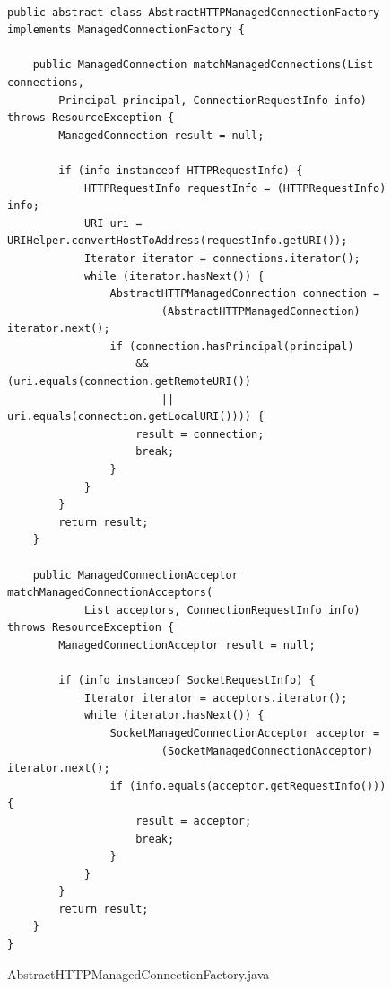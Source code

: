 \begin{figure}[!tbp]
\centering
\lstset{language=Java, stepnumber=1, showspaces=false, showstringspaces=false,breaklines=true}
\begin{lstlisting}

public abstract class AbstractHTTPManagedConnectionFactory implements ManagedConnectionFactory {

    public ManagedConnection matchManagedConnections(List connections,
        Principal principal, ConnectionRequestInfo info) throws ResourceException {
        ManagedConnection result = null;

        if (info instanceof HTTPRequestInfo) {
            HTTPRequestInfo requestInfo = (HTTPRequestInfo) info;
            URI uri = URIHelper.convertHostToAddress(requestInfo.getURI());
            Iterator iterator = connections.iterator();
            while (iterator.hasNext()) {
                AbstractHTTPManagedConnection connection =
                        (AbstractHTTPManagedConnection) iterator.next();
                if (connection.hasPrincipal(principal)
                    && (uri.equals(connection.getRemoteURI())
                        || uri.equals(connection.getLocalURI()))) {
                    result = connection;
                    break;
                }
            }
        }
        return result;
    }

    public ManagedConnectionAcceptor matchManagedConnectionAcceptors(
            List acceptors, ConnectionRequestInfo info) throws ResourceException {
        ManagedConnectionAcceptor result = null;

        if (info instanceof SocketRequestInfo) {
            Iterator iterator = acceptors.iterator();
            while (iterator.hasNext()) {
                SocketManagedConnectionAcceptor acceptor =
                        (SocketManagedConnectionAcceptor) iterator.next();
                if (info.equals(acceptor.getRequestInfo())) {
                    result = acceptor;
                    break;
                }
            }
        }
        return result;
    }
}

\end{lstlisting}
\caption{AbstractHTTPManagedConnectionFactory.java}
\label{}
\end{figure}


